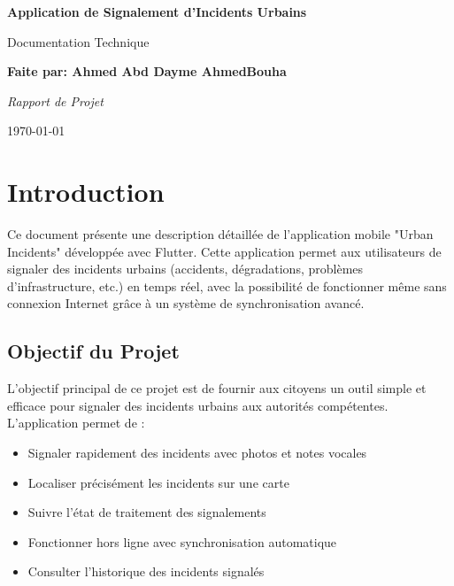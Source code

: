 \documentclass[12pt,a4paper]{article}
\begin{document}
\begin{titlepage}
    \centering
    \vspace*{2cm}
    {\Huge\bfseries Application de Signalement d'Incidents Urbains\par}
    \vspace{1.5cm}
    {\Large Documentation Technique\par}
    \vspace{2cm}
    {\Huge\bfseries  Faite par: Ahmed Abd Dayme AhmedBouha \par}
    \vspace{2cm}
    {\Large\itshape Rapport de Projet\par}
     \vspace{2cm}
    {\Huge\bfseries   \par}
    \vspace{2cm}
    \vfill
    {\large \today\par}
\end{titlepage}

\tableofcontents
\newpage

\section{Introduction}

Ce document présente une description détaillée de l'application mobile "Urban Incidents" développée avec Flutter. Cette application permet aux utilisateurs de signaler des incidents urbains (accidents, dégradations, problèmes d'infrastructure, etc.) en temps réel, avec la possibilité de fonctionner même sans connexion Internet grâce à un système de synchronisation avancé.

\subsection{Objectif du Projet}

L'objectif principal de ce projet est de fournir aux citoyens un outil simple et efficace pour signaler des incidents urbains aux autorités compétentes. L'application permet de :

\begin{itemize}
    \item Signaler rapidement des incidents avec photos et notes vocales
    \item Localiser précisément les incidents sur une carte
    \item Suivre l'état de traitement des signalements
    \item Fonctionner hors ligne avec synchronisation automatique
    \item Consulter l'historique des incidents signalés
\end{itemize}
\end{document}
